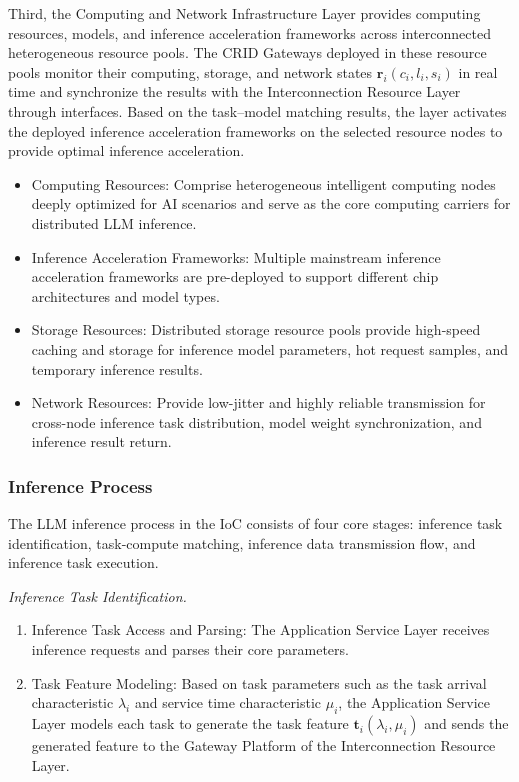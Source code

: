 \documentclass{ccjnl}
\begin{document}
Third, the Computing and Network Infrastructure Layer provides computing resources, models, and inference acceleration frameworks across interconnected heterogeneous resource pools. The CRID Gateways deployed in these resource pools monitor their computing, storage, and network states $\mathbf{r}_i(c_i,l_i,s_i)$ in real time and synchronize the results with the Interconnection Resource Layer through interfaces. Based on the task--model matching results, the layer activates the deployed inference acceleration frameworks on the selected resource nodes to provide optimal inference acceleration.

\begin{itemize}[nosep]
	\item Computing Resources: Comprise heterogeneous intelligent computing nodes deeply optimized for AI scenarios and serve as the core computing carriers for distributed LLM inference.
	
	\item Inference Acceleration Frameworks: Multiple mainstream inference acceleration frameworks are pre-deployed to support different chip architectures and model types.
	
	\item Storage Resources: Distributed storage resource pools provide high-speed caching and storage for inference model parameters, hot request samples, and temporary inference results.
	
	\item Network Resources: Provide low-jitter and highly reliable transmission for cross-node inference task distribution, model weight synchronization, and inference result return.
\end{itemize}

\subsubsection{Inference Process}
\label{s5-2-2}

The LLM inference process in the IoC consists of four core stages: inference task identification, task-compute matching, inference data transmission flow, and inference task execution.

\par
{}
\noindent\textit{Inference Task Identification.}\par

\begin{enumerate}[nosep,label=\arabic*)]
	\item Inference Task Access and Parsing: The Application Service Layer receives inference requests and parses their core parameters.
	
	\item Task Feature Modeling: Based on task parameters such as the task arrival characteristic $\lambda_i$ and service time characteristic $\mu_i$, the Application Service Layer models each task to generate the task feature $\mathbf{t}_i(\lambda_i,\mu_i)$ and sends the generated feature to the Gateway Platform of the Interconnection Resource Layer.
\end{enumerate}
\end{document}
